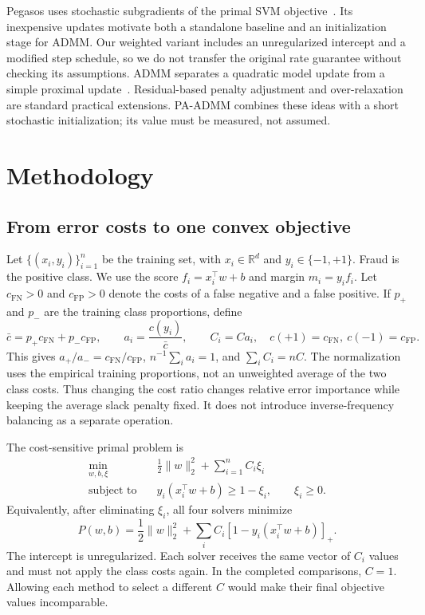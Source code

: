\documentclass{article}
\newcommand{\hinge}[1]{\left[#1\right]_{+}}
\newcommand{\R}{\mathbb{R}}
\newcommand{\FNcost}{c_{\mathrm{FN}}}
\newcommand{\FPcost}{c_{\mathrm{FP}}}
\begin{document}
Pegasos uses stochastic subgradients of the primal SVM objective~\citep{shalev2011}. Its inexpensive updates motivate both a standalone baseline and an initialization stage for ADMM. Our weighted variant includes an unregularized intercept and a modified step schedule, so we do not transfer the original rate guarantee without checking its assumptions. ADMM separates a quadratic model update from a simple proximal update~\citep{boyd2011}. Residual-based penalty adjustment and over-relaxation are standard practical extensions. PA-ADMM combines these ideas with a short stochastic initialization; its value must be measured, not assumed.

\section{Methodology}
\label{sec:methods}

\subsection{From error costs to one convex objective}

Let $\{(x_i,y_i)\}_{i=1}^n$ be the training set, with $x_i\in\R^d$ and $y_i\in\{-1,+1\}$. Fraud is the positive class. We use the score $f_i=x_i^\top w+b$ and margin $m_i=y_if_i$. Let $\FNcost>0$ and $\FPcost>0$ denote the costs of a false negative and a false positive. If $p_+$ and $p_-$ are the training class proportions, define
\begin{equation}
 \bar c=p_+\FNcost+p_-\FPcost,\qquad
 a_i=\frac{c(y_i)}{\bar c},\qquad C_i=C a_i,
 \quad c(+1)=\FNcost,\ c(-1)=\FPcost.
 \label{eq:weights}
\end{equation}
This gives $a_+/a_-=\FNcost/\FPcost$, $n^{-1}\sum_i a_i=1$, and $\sum_i C_i=nC$. The normalization uses the empirical training proportions, not an unweighted average of the two class costs. Thus changing the cost ratio changes relative error importance while keeping the average slack penalty fixed. It does not introduce inverse-frequency balancing as a separate operation.

The cost-sensitive primal problem is
\begin{equation}
 \begin{aligned}
  \min_{w,b,\xi}\quad &\frac12\lVert w\rVert_2^2+\sum_{i=1}^{n}C_i\xi_i\\
  \text{subject to}\quad &y_i(x_i^\top w+b)\geq 1-\xi_i,\qquad \xi_i\geq0.
 \end{aligned}
 \label{eq:primal}
\end{equation}
Equivalently, after eliminating $\xi_i$, all four solvers minimize
\begin{equation}
 P(w,b)=\frac12\lVert w\rVert_2^2+\sum_i C_i\hinge{1-y_i(x_i^\top w+b)}.
 \label{eq:hinge}
\end{equation}
The intercept is unregularized. Each solver receives the same vector of $C_i$ values and must not apply the class costs again. In the completed comparisons, $C=1$. Allowing each method to select a different $C$ would make their final objective values incomparable.
\end{document}
